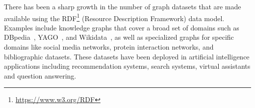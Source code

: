 
There has been a sharp growth in the number of graph datasets that are made available using the RDF\footnote{\url{https://www.w3.org/RDF}} (Resource Description Framework) data model.
Examples include knowledge graphs that cover a broad set of domains such as DBpedia~\cite{lehmann2015dbpedia}, YAGO~\cite{yago2}, and Wikidata~\cite{vrandecic12wikidata}, as well as specialized graphs for specific domains like social media networks, protein interaction networks, and bibliographic datasets. These datasets have been deployed in artificial intelligence applications including recommendation systems, search systems, virtual assistants and question answering. 

